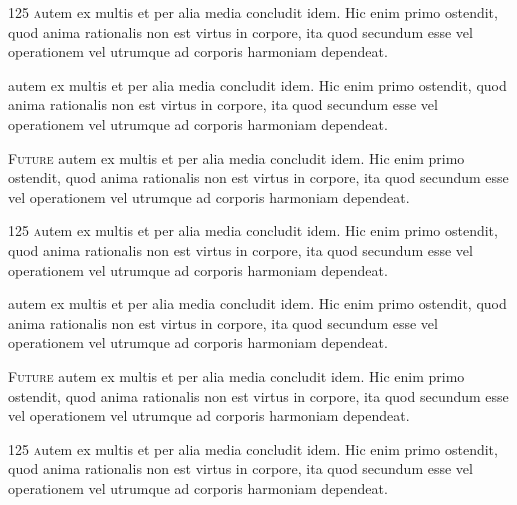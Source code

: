 \lettrine{125 }
autem ex multis et per alia media concludit idem. Hic enim primo ostendit, quod anima rationalis 
non est virtus in corpore, ita quod secundum esse vel
operationem vel utrumque ad corporis harmoniam dependeat.

\lettrine{}{}
autem ex multis et per alia media concludit idem. Hic enim primo ostendit, quod anima rationalis 
non est virtus in corpore, ita quod secundum esse vel
operationem vel utrumque ad corporis harmoniam dependeat.

\lettrine{}{Future}
autem ex multis et per alia media concludit idem. Hic enim primo ostendit, quod anima rationalis 
non est virtus in corpore, ita quod secundum esse vel
operationem vel utrumque ad corporis harmoniam dependeat.

\lettrine{125 }
autem ex multis et per alia media concludit idem. Hic enim primo ostendit, quod anima rationalis 
non est virtus in corpore, ita quod secundum esse vel
operationem vel utrumque ad corporis harmoniam dependeat.

\lettrine{}{}
autem ex multis et per alia media concludit idem. Hic enim primo ostendit, quod anima rationalis 
non est virtus in corpore, ita quod secundum esse vel
operationem vel utrumque ad corporis harmoniam dependeat.

\lettrine{}{Future}
autem ex multis et per alia media concludit idem. Hic enim primo ostendit, quod anima rationalis 
non est virtus in corpore, ita quod secundum esse vel
operationem vel utrumque ad corporis harmoniam dependeat.

\lettrine{125 }
autem ex multis et per alia media concludit idem. Hic enim primo ostendit, quod anima rationalis 
non est virtus in corpore, ita quod secundum esse vel
operationem vel utrumque ad corporis harmoniam dependeat.

